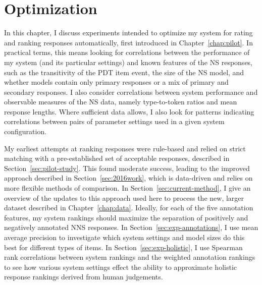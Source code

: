 \chapter{Optimization}
\label{chap:optimization}
In this chapter, I discuss experiments intended to optimize my system for rating and ranking responses automatically, first introduced in Chapter~\ref{chap:pilot}. In practical terms, this means looking for correlations between the performance of my system (and its particular settings) and known features of the NS responses, such as the transitivity of the PDT item event, the size of the NS model, and whether models contain only primary responses or a mix of primary and secondary responses. I also consider correlations between system performance and observable measures of the NS data, namely type-to-token ratios and mean response lengths. Where sufficient data allows, I also look for patterns indicating correlations between pairs of parameter settings used in a given system configuration.

My earliest attempts at ranking responses were rule-based and relied on strict matching with a pre-established set of acceptable responses, described in Section~\ref{sec:pilot-study}. This found moderate success, leading to the improved approach described in Section~\ref{sec:2016work}, which is data-driven and relies on more flexible methods of comparison.
In Section~\ref{sec:current-method}, I give an overview of the updates to this approach used here to process the new, larger dataset described in Chapter~\ref{chap:data}. Ideally, for each of the five annotation features, my system rankings should maximize the separation of positively and negatively annotated NNS responses. In Section~\ref{sec:exp-annotations}, I use mean average precision to investigate which system settings and model sizes do this best for different types of items. In Section~\ref{sec:exp-holistic}, I use Spearman rank correlations between system rankings and the weighted annotation rankings to see how various system settings effect the ability to approximate holistic response rankings derived from human judgements.


